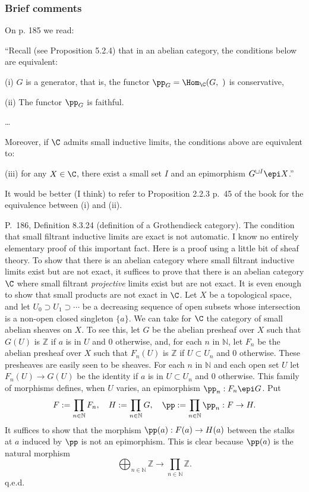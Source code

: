 \documentclass[12pt]{article}
\theoremstyle{remark}
\theoremstyle{definition}
\begin{document}

\subsubsection{Brief comments}

\begin{s} 
On p. 185 we read:

``Recall (see Proposition 5.2.4) that in an abelian category, the conditions
below are equivalent:

(i) $G$ is a generator, that is, the functor $\pp_G=\Hom_\C(G,\ )$ is conservative,

(ii) The functor $\pp_G$ is faithful.

\nn\dots

Moreover, if $\C$ admits small inductive limits, the conditions above are
equivalent to:

(iii) for any $X\in\C$, there exist a small set $I$ and an epimorphism $G^{\sqcup I}\epi X$.''

It would be better (I think) to refer to Proposition 2.2.3 p.~45 of the book for the equivalence between (i) and (ii).
\end{s}

%

\begin{s} 
P.~186, Definition 8.3.24 (definition of a Grothendieck category). The condition that small filtrant inductive limits are exact is not automatic. I know no entirely elementary proof of this important fact. Here is a proof using a little bit of sheaf theory. To show that there is an abelian category where small filtrant inductive limits exist but are not exact, it suffices to prove that there is an abelian category $\C$ where small filtrant {\em projective} limits exist but are not exact. It is even enough to show that small products are not exact in $\C$. Let $X$ be a topological space, and let $U_0\supset U_1\supset\cdots$ be a decreasing sequence of open subsets whose intersection is a non-open closed singleton $\{a\}$. We can take for $\C$ the category of small abelian sheaves on $X$. To see this, let $G$ be the abelian presheaf over $X$ such that $G(U)$ is $\mathbb Z$ if $a$ is in $U$ and 0 otherwise, and, for each $n$ in $\mathbb N$, let $F_n$ be the abelian presheaf over $X$ such that $F_n(U)$ is $\mathbb Z$ if $U\subset U_n$ and 0 otherwise. These presheaves are easily seen to be sheaves. For each $n$ in $\mathbb N$ and each open set $U$ let $F_n(U)\to G(U)$ be the identity if $a$ is in $U\subset U_n$ and 0 otherwise. This family of morphisms defines, when $U$ varies, an epimorphism $\pp_n:F_n\epi G$. Put 
$$
F:=\prod_{n\in\mathbb N}F_n,\quad H:=\prod_{n\in\mathbb N}G,\quad\pp:=\prod_{n\in\mathbb N}\pp_n:F\to H.
$$ 
It suffices to show that the morphism $\pp(a):F(a)\to H(a)$ between the stalks at $a$ induced by $\pp$ is not an epimorphism. This is clear because $\pp(a)$ is the natural morphism 
$$
\bigoplus_{n\in\mathbb N}\mathbb Z\to\prod_{n\in\mathbb N}\mathbb Z.
$$
q.e.d.
\end{s}
\end{document}
